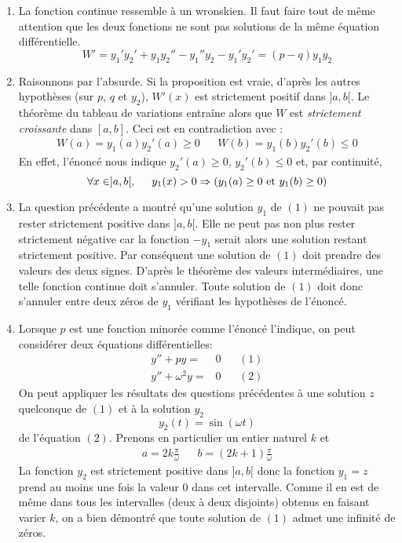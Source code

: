 \begin{enumerate}
 \item La fonction continue ressemble à un wronskien. Il faut faire tout de même attention que les deux fonctions ne sont pas solutions de la même équation différentielle.
\begin{displaymath}
 W'=y_1'y_2'+y_1y_2''-y_1''y_2 - y_1'y_2'=(p-q)y_1y_2
\end{displaymath}

\item Raisonnons par l'absurde. Si la proposition est vraie, d'après les autres hypothèses (sur $p$, $q$ et $y_2$), $W'(x)$ est strictement positif dans $]a,b[$. Le théorème du tableau de variations entraîne alors que $W$ est \emph{strictement croissante} dans $[a,b]$. Ceci est en contradiction avec :
\begin{align*}
 W(a)=y_1(a)y_2'(a)\geq 0  & & W(b)=y_1(b)y_2'(b)\leq 0 
\end{align*}
 En effet, l'énoncé nous indique $y_2'(a)\geq 0$, $y_2'(b)\leq 0$ et, par continuité,
\begin{displaymath}
 \forall x\in]a,b[,\hspace{0.5cm} y_1(x)>0 \Rightarrow \left( y_1(a)\geq 0 \text{ et } y_1(b)\geq 0\right) 
\end{displaymath}

\item La question précédente a montré qu'une solution $y_1$ de $(1)$ ne pouvait pas rester strictement positive dans $]a,b[$. Elle ne peut pas non plus rester strictement négative car la fonction $-y_1$ serait alors une solution restant strictement positive. Par conséquent une solution de $(1)$ doit prendre des valeurs des deux signes. D'après le théorème des valeurs intermédiaires, une telle fonction continue doit s'annuler. Toute solution de $(1)$ doit donc s'annuler entre deux zéros de $y_1$ vérifiant les hypothèses de l'énoncé.
\item Lorsque $p$ est une fonction minorée comme l'énoncé l'indique, on peut considérer deux équations différentielles:
\begin{align*}
 y'' +p y =& 0 & &(1)\\
y''+\omega^2 y =& 0 & &(2)
\end{align*}
On peut appliquer les résultats des questions précédentes à une solution $z$ quelconque de $(1)$ et à la solution $y_2$
\begin{displaymath}
 y_2(t)= \sin (\omega t)
\end{displaymath}
de l'équation $(2)$. Prenons en particulier un entier naturel $k$ et
\begin{align*}
 a=2k\frac{\pi}{\omega} & & b=(2k+1)\frac{\pi}{\omega}
\end{align*}
La fonction $y_2$ est strictement positive dans $]a,b[$ donc la fonction $y_1=z$ prend au moins une fois la valeur $0$ dans cet intervalle.  Comme il en est de même dans tous les intervalles (deux à deux disjoints) obtenus en faisant varier $k$, on a bien démontré que toute solution de $(1)$ admet une infinité de zéros.
\end{enumerate}
